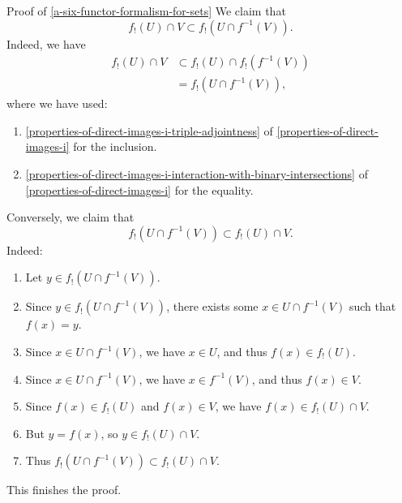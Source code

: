 \begin{Proof}{Proof of \cref{a-six-functor-formalism-for-sets}}
    We claim that
    \[
        f_{!}(U)\cap V%
        \subset%
        f_{!}(U\cap f^{-1}(V)).%
    \]%
    Indeed, we have
    \begin{align*}
        f_{!}(U)\cap V &\subset f_{!}(U)\cap f_{!}(f^{-1}(V))\\
                       &=       f_{!}(U\cap f^{-1}(V)),
    \end{align*}
    where we have used:
    \begin{enumerate}
        \item\label{proof-of-a-six-functor-formalism-for-sets-the-projection-formula-1-1}\cref{properties-of-direct-images-i-triple-adjointness} of \cref{properties-of-direct-images-i} for the inclusion.
        \item\label{proof-of-a-six-functor-formalism-for-sets-the-projection-formula-1-2}\cref{properties-of-direct-images-i-interaction-with-binary-intersections} of \cref{properties-of-direct-images-i} for the equality.
    \end{enumerate}
    Conversely, we claim that
    \[
        f_{!}(U\cap f^{-1}(V))%
        \subset%
        f_{!}(U)\cap V.%
    \]%
    Indeed:
    \begin{enumerate}
        \item\label{proof-of-a-six-functor-formalism-for-sets-the-projection-formula-1-3}Let $y\in f_{!}(U\cap f^{-1}(V))$.
        \item\label{proof-of-a-six-functor-formalism-for-sets-the-projection-formula-1-4}Since $y\in f_{!}(U\cap f^{-1}(V))$, there exists some $x\in U\cap f^{-1}(V)$ such that $f(x)=y$.
        \item\label{proof-of-a-six-functor-formalism-for-sets-the-projection-formula-1-5}Since $x\in U\cap f^{-1}(V)$, we have $x\in U$, and thus $f(x)\in f_{!}(U)$.
        \item\label{proof-of-a-six-functor-formalism-for-sets-the-projection-formula-1-6}Since $x\in U\cap f^{-1}(V)$, we have $x\in f^{-1}(V)$, and thus $f(x)\in V$.
        \item\label{proof-of-a-six-functor-formalism-for-sets-the-projection-formula-1-7}Since $f(x)\in f_{!}(U)$ and $f(x)\in V$, we have $f(x)\in f_{!}(U)\cap V$.
        \item\label{proof-of-a-six-functor-formalism-for-sets-the-projection-formula-1-8}But $y=f(x)$, so $y\in f_{!}(U)\cap V$.
        \item\label{proof-of-a-six-functor-formalism-for-sets-the-projection-formula-1-9}Thus $f_{!}(U\cap f^{-1}(V))\subset f_{!}(U)\cap V$.%
    \end{enumerate}
    This finishes the proof.


\end{Proof}

